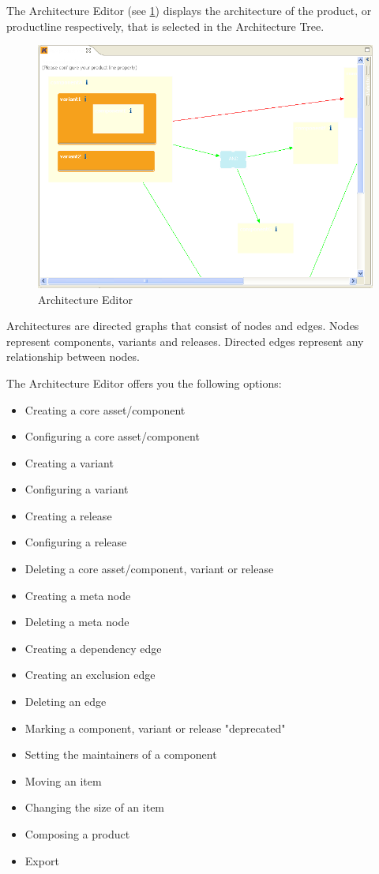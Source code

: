 The Architecture Editor (see \ref{architecture}) displays the architecture of the product,
or productline respectively, that is selected in the Architecture Tree. \par

\begin{figure}[h!]
\begin{center}
\includegraphics[width=15cm]{architecture.png}
   \caption{Architecture Editor}
\label{architecture}
\end{center}
\end{figure}\par

Architectures are directed graphs that consist of nodes and edges. 
Nodes represent components, variants and releases. Directed edges represent
any relationship between nodes.\par

The Architecture Editor offers you the following options:
\begin{itemize}
	\item Creating a core asset/component
	\item Configuring a core asset/component
	\item Creating a variant
	\item Configuring a variant
	\item Creating a release
	\item Configuring a release
	\item Deleting a core asset/component, variant or release
	\item Creating a meta node
	\item Deleting a meta node
	\item Creating a dependency edge
	\item Creating an exclusion edge
	\item Deleting an edge
	\item Marking a component, variant or release "deprecated"
	\item Setting the maintainers of a component
	\item Moving an item
	\item Changing the size of an item
	\item Composing a product
	\item Export
\end{itemize}

